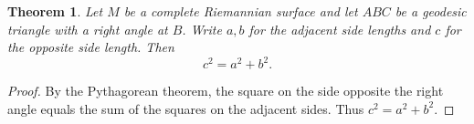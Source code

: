 \documentclass{article}
\newtheorem{theorem}{Theorem}
\begin{document}
\begin{theorem}\label{thm:riemannian-pythagoras-gap}
Let $M$ be a complete Riemannian surface and let $ABC$ be a geodesic triangle with a right angle at $B$. Write $a,b$ for the adjacent side lengths and $c$ for the opposite side length. Then
\[
c^2=a^2+b^2.
\]
\end{theorem}
\begin{proof}
By the Pythagorean theorem, the square on the side opposite the right angle equals the sum of the squares on the adjacent sides. Thus $c^2=a^2+b^2$.
\end{proof}
\end{document}
